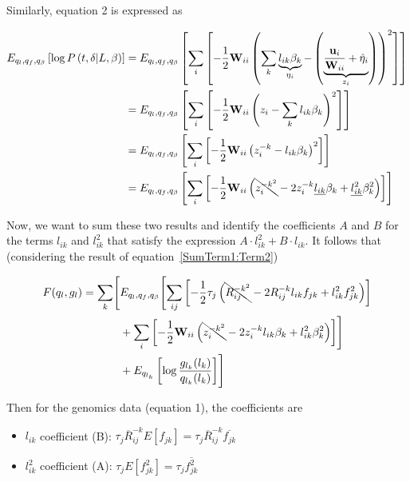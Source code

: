 \documentclass{article}[12pt]
\begin{document}
Similarly, equation 2 is expressed as

\begin{align}
    E_{q_l, q_f, q_{\beta}}\left[\log P\left(t, \delta \vert L, \beta\right)\right] &= E_{q_l, q_f, q_{\beta}}\left[\sum_{i}\left[-\frac{1}{2}\mathbf{W}_{ii}\left(\sum_{k}\underbrace{l_{ik}\beta_{k}}_{\eta_i}-\left(\underbrace{\frac{\mathbf{u}_{i}}{\mathbf{W}_{ii}}+\hat{\eta}_{i}}_{z_i}\right)\right)^2\right]\right]\\
    &= E_{q_l, q_f, q_{\beta}}\left[\sum_{i}\left[-\frac{1}{2}\mathbf{W}_{ii}\left(z_{i} - \sum_{k}l_{ik}\beta_{k}\right)^2\right]\right]\\
    &= E_{q_l, q_f, q_{\beta}}\left[\sum_{i}\left[-\frac{1}{2}\mathbf{W}_{ii}\left(z_{i}^{-k}-l_{ik}\beta_{k}\right)^2\right]\right]\\
    &= E_{q_l, q_f, q_{\beta}}\left[\sum_{i}\left[-\frac{1}{2}\mathbf{W}_{ii}\left(\bcancel{z_{i}^{-k^2}}-2z_{i}^{-k}\underline{l_{ik}}\beta_{k}+\underline{l_{ik}^{2}}\beta_{k}^{2}\right)\right]\right]
\end{align}

Now, we want to sum these two results and identify the coefficients $A$ and $B$ for the terms $l_{ik}$ and $l_{ik}^2$ that satisfy the expression $A\cdot l_{ik}^{2} + B\cdot l_{ik}$. It follows that (considering the result of equation~\ref{SumTerm1:Term2})

\begin{equation}
\begin{aligned}
F(q_l, g_l) = \sum_{k} \Biggl[ & E_{q_l, q_f, q_{\beta}} \Biggl[ \sum_{ij} \left[ -\frac{1}{2}\tau_{j} \left( \bcancel{R_{ij}^{-k^2}} - 2R_{ij}^{-k} l_{ik} f_{jk} + l_{ik}^{2} f_{jk}^{2} \right) \right] \\
& + \sum_{i} \left[ -\frac{1}{2}\mathbf{W}_{ii} \left( \bcancel{z_{i}^{-k^2}} - 2z_{i}^{-k} l_{ik} \beta_{k} + l_{ik}^{2} \beta_{k}^{2} \right) \right] \Biggr] \\
& + E_{q_{l_k}} \left[ \log \frac{g_{l_k}(l_k)}{q_{l_k}(l_k)} \right] \Biggr]
\end{aligned}
\end{equation}

Then for the genomics data (equation 1), the coefficients are

\begin{itemize}
    \item $l_{ik}$ coefficient (B): $\tau_{j}\overline{R}^{-k}_{ij}E\left[f_{jk}\right] = \tau_{j}\overline{R}^{-k}_{ij}\overline{f_{jk}}$

    \item $l_{ik}^{2}$ coefficient (A): $\tau_{j}E\left[f^{2}_{jk}\right] = \tau_{j}\overline{f^{2}_{jk}}$
\end{itemize}
\end{document}
